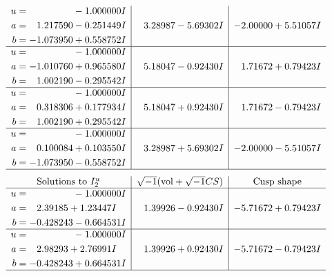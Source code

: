 \documentclass[1p]{elsarticle_modified}
\theoremstyle{definition}
\newcommand{\I}{\sqrt{-1}}
\begin{document}
$$\begin{array}{c|c|c}
\begin{aligned}
u &= \phantom{-0.000000 } -1.000000 I \\
a &= \phantom{-}1.217590 - 0.251449 I \\
b &= -1.073950 + 0.558752 I\end{aligned}
 & \phantom{-}3.28987 - 5.69302 I & -2.00000 + 5.51057 I \\ \hline\begin{aligned}
u &= \phantom{-0.000000 } -1.000000 I \\
a &= -1.010760 + 0.965580 I \\
b &= \phantom{-}1.002190 - 0.295542 I\end{aligned}
 & \phantom{-}5.18047 - 0.92430 I & \phantom{-}1.71672 + 0.79423 I \\ \hline\begin{aligned}
u &= \phantom{-0.000000 } -1.000000 I \\
a &= \phantom{-}0.318306 + 0.177934 I \\
b &= \phantom{-}1.002190 + 0.295542 I\end{aligned}
 & \phantom{-}5.18047 + 0.92430 I & \phantom{-}1.71672 - 0.79423 I \\ \hline\begin{aligned}
u &= \phantom{-0.000000 } -1.000000 I \\
a &= \phantom{-}0.100084 + 0.103550 I \\
b &= -1.073950 - 0.558752 I\end{aligned}
 & \phantom{-}3.28987 + 5.69302 I & -2.00000 - 5.51057 I\\
 \hline 
 \end{array}$$\newpage$$\begin{array}{c|c|c}  
\text{Solutions to }I^u_{2}& \I (\text{vol} + \sqrt{-1}CS) & \text{Cusp shape}\\
 \hline 
\begin{aligned}
u &= \phantom{-0.000000 } -1.000000 I \\
a &= \phantom{-}2.39185 + 1.23447 I \\
b &= -0.428243 - 0.664531 I\end{aligned}
 & \phantom{-}1.39926 - 0.92430 I & -5.71672 + 0.79423 I \\ \hline\begin{aligned}
u &= \phantom{-0.000000 } -1.000000 I \\
a &= \phantom{-}2.98293 + 2.76991 I \\
b &= -0.428243 + 0.664531 I\end{aligned}
 & \phantom{-}1.39926 + 0.92430 I & -5.71672 - 0.79423 I\\
 \hline 
 \end{array}$$\newpage\newpage\renewcommand{\arraystretch}{1}
\end{document}
